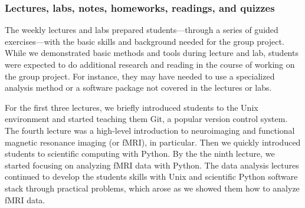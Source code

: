 
\subsubsection{Lectures, labs, notes, homeworks, readings, and quizzes}

The weekly lectures and labs prepared students---through a
series of guided exercises---with the basic skills and
background needed for the group project.
While we demonstrated basic methods and tools during lecture and lab,
students were expected to do additional research and reading in the course
of working on the group project.
For instance, they may have needed to use a specialized analysis
method or a software package not covered in the lectures or labs.


For the first three lectures, we briefly introduced students to the Unix
environment and started teaching them Git, a popular version control system.
The fourth lecture was a high-level introduction to neuroimaging and
functional magnetic resonance imaging (or fMRI), in particular.
Then we quickly introduced students to scientific computing with Python.
By the the ninth lecture, we started focusing on analyzing fMRI data
with Python.
The data analysis lectures continued to develop the students skills with
Unix and scientific Python software stack through practical problems,
which arose as we showed them how to analyze fMRI data.

